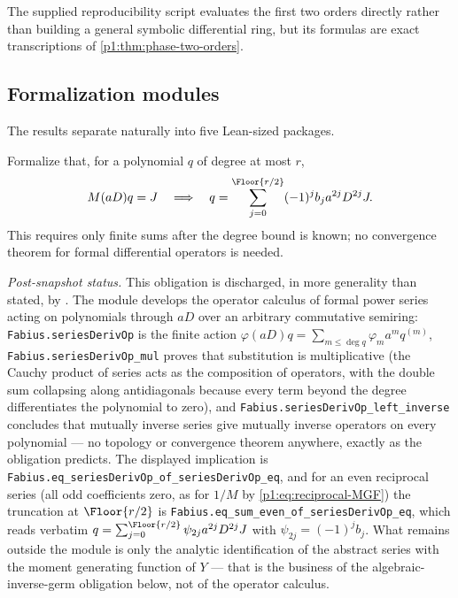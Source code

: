 \documentclass[11pt,oneside]{article}
\numberwithin{equation}{section}
\theoremstyle{definition}
\theoremstyle{remark}
\begin{document}
The supplied reproducibility script evaluates the first two orders directly rather than
building a general symbolic differential ring, but its formulas are exact transcriptions of
\cref{p1:thm:phase-two-orders}.

\subsection{Formalization modules}

The results separate naturally into five Lean-sized packages.

\begin{obligation}
Formalize that, for a polynomial $q$ of degree at most $r$,
\[
 M(aD)q=J \quad\Longrightarrow\quad
 q=\sum_{j=0}^{\Floor{r/2}}(-1)^jb_ja^{2j}D^{2j}J.
\]
This requires only finite sums after the degree bound is known; no convergence theorem for
formal differential operators is needed.
\end{obligation}

\emph{Post-snapshot status.}  This obligation is discharged, in more generality than
stated, by .  The module develops the operator
calculus of formal power series acting on polynomials through $aD$ over an arbitrary
commutative semiring: \nolinkurl{Fabius.seriesDerivOp} is the finite action
$\varphi(aD)q=\sum_{m\le\deg q}\varphi_m a^m q^{(m)}$,
\nolinkurl{Fabius.seriesDerivOp_mul} proves that substitution is multiplicative (the
Cauchy product of series acts as the composition of operators, with the double sum
collapsing along antidiagonals because every term beyond the degree differentiates the
polynomial to zero), and \nolinkurl{Fabius.seriesDerivOp_left_inverse} concludes that
mutually inverse series give mutually inverse operators on every polynomial --- no
topology or convergence theorem anywhere, exactly as the obligation predicts.  The
displayed implication is \nolinkurl{Fabius.eq_seriesDerivOp_of_seriesDerivOp_eq}, and
for an even reciprocal series (all odd coefficients zero, as for $1/M$ by
\eqref{p1:eq:reciprocal-MGF}) the truncation at $\Floor{r/2}$ is
\nolinkurl{Fabius.eq_sum_even_of_seriesDerivOp_eq}, which reads verbatim
$q=\sum_{j=0}^{\Floor{r/2}}\psi_{2j}a^{2j}D^{2j}J$ with
$\psi_{2j}=(-1)^jb_j$.  What remains outside the module is only the analytic
identification of the abstract series with the moment generating function of $Y$ ---
that is the business of the algebraic-inverse-germ obligation below, not of the
operator calculus.
\end{document}
